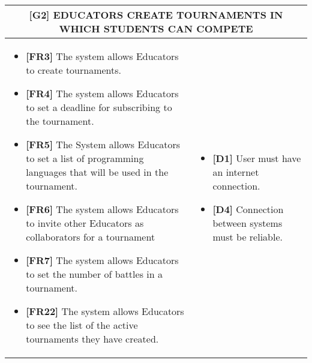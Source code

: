 \documentclass{article}
\begin{document}
\begin{table}[H]
\begin{adjustwidth}{-1in}{-1in}
 \renewcommand{\arraystretch}{1.5}
    \begin{tabular}{|p{9.5cm}|p{9.5cm}|}
        \hline
        \multicolumn{2}{|c|}{\textbf{[G2] EDUCATORS CREATE TOURNAMENTS IN WHICH STUDENTS CAN COMPETE}} \\
        \hline
        \begin{itemize}[label={}, left=0pt, align=left, itemsep=5pt]
            \item \textbf{[FR3]} The system allows Educators to create tournaments.
            \item \textbf{[FR4]} The system allows Educators to set a deadline for subscribing to the tournament.
            \item \textbf{[FR5]} The System allows Educators to set a list of programming languages that will be used in the tournament.
            \item \textbf{[FR6]} The system allows Educators to invite other Educators as collaborators for a tournament
            \item \textbf{[FR7]} The system allows Educators to set the number of battles in a tournament.
            \item \textbf{[FR22]} The system allows Educators to see the list of the active tournaments they have created.
        \end{itemize} &
        \begin{itemize}[label={}, left=0pt, align=left, itemsep=5pt]
            \item \textbf{[D1]} User must have an internet connection.
            \item \textbf{[D4]} Connection between systems must be reliable.
        \end{itemize} \\
        \hline
    \end{tabular}
\end{adjustwidth}
\end{table}
\end{document}
